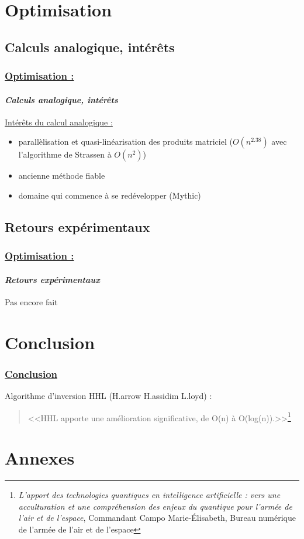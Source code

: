 \documentclass[10pt]{beamer}
\begin{document}
	\section{Optimisation}
	\subsection{Calculs analogique, int\'er\^ets}
	\begin{frame}
		\frametitle{\uline{Optimisation :}}
		\framesubtitle{\textit{Calculs analogique, int\'er\^ets}}
		\uline{Int\'er\^ets du calcul analogique :}
		\begin{itemize}
			\item parall\`elisation et quasi-linéarisation des produits matriciel ($O(n^{2.38})$ avec l'algorithme de Strassen à $O(n^2)$)
			\item ancienne m\'ethode fiable
			\item domaine qui commence \`a se red\'evelopper (Mythic)
		\end{itemize}
	\end{frame}
	\subsection{Retours exp\'erimentaux}
	\begin{frame}
		\frametitle{\uline{Optimisation :}}
		\framesubtitle{\textit{Retours exp\'erimentaux}}
		Pas encore fait
	\end{frame}
	
	
	
	\section{Conclusion}
	\begin{frame}
		\frametitle{\uline{Conclusion}}
		\centering
  		\vfill
		Algorithme d'inversion HHL (H.arrow H.assidim L.loyd) :
		\begin{quote}
			<<HHL apporte une amélioration significative, de O(n) à O(log(n)).>>\footnote{\textit{L’apport des technologies quantiques en intelligence artificielle : vers une acculturation et une compr\'ehension des enjeux du quantique pour l’arm\'ee de l’air et de l’espace}, Commandant Campo Marie-\'Elisabeth, Bureau num\'erique de l’arm\'ee de l’air et de l’espace}
		\end{quote}
	\end{frame}
	
	\section{Annexes}
\end{document}
